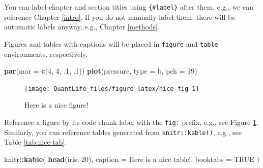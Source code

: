 \documentclass[
]{book}
\newenvironment{Shaded}{\begin{snugshade}}{\end{snugshade}}
\newcommand{\DataTypeTok}[1]{\textcolor[rgb]{0.13,0.29,0.53}{#1}}
\newcommand{\DecValTok}[1]{\textcolor[rgb]{0.00,0.00,0.81}{#1}}
\newcommand{\FloatTok}[1]{\textcolor[rgb]{0.00,0.00,0.81}{#1}}
\newcommand{\KeywordTok}[1]{\textcolor[rgb]{0.13,0.29,0.53}{\textbf{#1}}}
\newcommand{\NormalTok}[1]{#1}
\newcommand{\OperatorTok}[1]{\textcolor[rgb]{0.81,0.36,0.00}{\textbf{#1}}}
\newcommand{\OtherTok}[1]{\textcolor[rgb]{0.56,0.35,0.01}{#1}}
\newcommand{\StringTok}[1]{\textcolor[rgb]{0.31,0.60,0.02}{#1}}
\begin{document}
You can label chapter and section titles using \texttt{\{\#label\}} after them, e.g., we can reference Chapter \ref{intro}. If you do not manually label them, there will be automatic labels anyway, e.g., Chapter \ref{methods}.

Figures and tables with captions will be placed in \texttt{figure} and \texttt{table} environments, respectively.

\begin{Shaded}
\begin{Highlighting}[]
\KeywordTok{par}\NormalTok{(}\DataTypeTok{mar =} \KeywordTok{c}\NormalTok{(}\DecValTok{4}\NormalTok{, }\DecValTok{4}\NormalTok{, }\FloatTok{.1}\NormalTok{, }\FloatTok{.1}\NormalTok{))}
\KeywordTok{plot}\NormalTok{(pressure, }\DataTypeTok{type =} \StringTok{\textquotesingle{}b\textquotesingle{}}\NormalTok{, }\DataTypeTok{pch =} \DecValTok{19}\NormalTok{)}
\end{Highlighting}
\end{Shaded}

\begin{figure}

{\centering \texttt{[image: QuantLife\_files/figure-latex/nice-fig-1]} 

}

\caption{Here is a nice figure!}\label{fig:nice-fig}
\end{figure}

Reference a figure by its code chunk label with the \texttt{fig:} prefix, e.g., see Figure \ref{fig:nice-fig}. Similarly, you can reference tables generated from \texttt{knitr::kable()}, e.g., see Table \ref{tab:nice-tab}.

\begin{Shaded}
\begin{Highlighting}[]
\NormalTok{knitr}\OperatorTok{::}\KeywordTok{kable}\NormalTok{(}
  \KeywordTok{head}\NormalTok{(iris, }\DecValTok{20}\NormalTok{), }\DataTypeTok{caption =} \StringTok{\textquotesingle{}Here is a nice table!\textquotesingle{}}\NormalTok{,}
  \DataTypeTok{booktabs =} \OtherTok{TRUE}
\NormalTok{)}
\end{Highlighting}
\end{Shaded}
\end{document}
